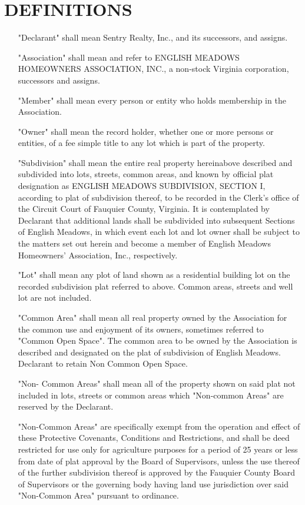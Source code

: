 \documentclass[12pt, letterpaper]{article}
\begin{document}
\section{DEFINITIONS}
\begin{itemize}
 \item["Declarant"] shall mean Sentry Realty, Inc., and its successors, and assigns.
 \item["Association"] shall mean and refer to ENGLISH MEADOWS HOMEOWNERS ASSOCIATION, INC., a non-stock Virginia corporation, successors and assigns.
 \item["Member"] shall mean every person or entity who holds membership in the Association.
 \item["Owner"] shall mean the record holder, whether one or more persons or entities, of a fee simple title to any lot which is part of the property.
 \item["Subdivision"] shall mean the entire real property hereinabove described and subdivided into lots, streets, common areas, and known by official plat designation as ENGLISH MEADOWS SUBDIVISION, SECTION I, according to plat of subdivision thereof, to be recorded in the Clerk's office of the Circuit Court of Fauquier County, Virginia.
  It is contemplated by Declarant that additional lands shall be subdivided into subsequent Sections of English Meadows, in which event each lot and lot owner shall be subject to the matters set out herein and become a member of English Meadows Homeowners' Association, Inc., respectively.
 \item["Lot"] shall mean any plot of land shown as a residential building lot on the recorded subdivision plat referred to above.
  Common areas, streets and well lot are not included.
 \item["Common Area"] shall mean all real property owned by the Association for the common use and enjoyment of its owners, sometimes referred to "Common Open Space".
  The common area to be owned by the Association is described and designated on the plat of subdivision of English Meadows.
  Declarant to retain Non Common Open Space.

  "Non- Common Areas" shall mean all of the property shown on said plat not included in lots, streets or common areas which "Non-common Areas" are reserved by the Declarant.

  "Non-Common Areas" are specifically exempt from the operation and effect of these Protective Covenants, Conditions and Restrictions, and shall be deed restricted for use only for agriculture purposes for a period of 25 years or less from date of plat approval by the Board of Supervisors, unless the use thereof of the further subdivision thereof is approved by the Fauquier County Board of Supervisors or the governing body having land use jurisdiction over said "Non-Common Area" pursuant to ordinance.
\end{itemize}
\end{document}
